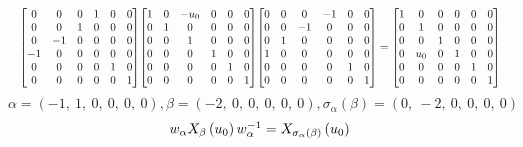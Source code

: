 \documentclass[11pt]{article}
\theoremstyle{definition}
\begin{document}
\[
\scaletoalign{\textwidth}{{\left[\begin{matrix}0 & 0 & 0 & 1 & 0 & 0\\0 & 0 & 1 & 0 & 0 & 0\\0 & -1 & 0 & 0 & 0 & 0\\-1 & 0 & 0 & 0 & 0 & 0\\0 & 0 & 0 & 0 & 1 & 0\\0 & 0 & 0 & 0 & 0 & 1\end{matrix}\right]} {\left[\begin{matrix}1 & 0 & - u_{0} & 0 & 0 & 0\\0 & 1 & 0 & 0 & 0 & 0\\0 & 0 & 1 & 0 & 0 & 0\\0 & 0 & 0 & 1 & 0 & 0\\0 & 0 & 0 & 0 & 1 & 0\\0 & 0 & 0 & 0 & 0 & 1\end{matrix}\right]} {\left[\begin{matrix}0 & 0 & 0 & -1 & 0 & 0\\0 & 0 & -1 & 0 & 0 & 0\\0 & 1 & 0 & 0 & 0 & 0\\1 & 0 & 0 & 0 & 0 & 0\\0 & 0 & 0 & 0 & 1 & 0\\0 & 0 & 0 & 0 & 0 & 1\end{matrix}\right]} = {\left[\begin{matrix}1 & 0 & 0 & 0 & 0 & 0\\0 & 1 & 0 & 0 & 0 & 0\\0 & 0 & 1 & 0 & 0 & 0\\0 & u_{0} & 0 & 1 & 0 & 0\\0 & 0 & 0 & 0 & 1 & 0\\0 & 0 & 0 & 0 & 0 & 1\end{matrix}\right]}}
\]
\[
\alpha = \left( -1, \  1, \  0, \  0, \  0, \  0\right), \beta = \left( -2, \  0, \  0, \  0, \  0, \  0\right), \sigma_{\alpha}(\beta) = \left( 0, \  -2, \  0, \  0, \  0, \  0\right)
\]
\[
\scaletoalign{\textwidth}{w_{\alpha} X_{\beta}\left(u_{0}\right) w_{\alpha}^{-1} = X_{\sigma_{\alpha}\left(\beta\right)}\left(u_{0}\right)}
\]
\end{document}
